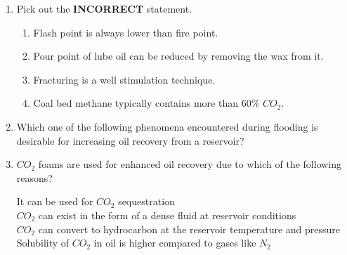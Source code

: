 \documentclass[journal,12pt,onecolumn]{IEEEtran}
\theoremstyle{remark}
\begin{document}
\begin{enumerate}
\item Pick out the \textbf{INCORRECT} statement.

\hfill{}

\begin{enumerate}
\item Flash point is always lower than fire point.
\item Pour point of lube oil can be reduced by removing the wax from it.
\item Fracturing is a well stimulation technique.
\item Coal bed methane typically contains more than 60\% $CO_2$.
\end{enumerate}

\item Which one of the following phenomena encountered during flooding is desirable for
increasing oil recovery from a reservoir?

\hfill{}

\begin{enumerate}
\end{enumerate}

\item $CO_2$ foams are used for enhanced oil recovery due to which of the following reasons?

\hfill{}
	
It can be used for $CO_2$ sequestration\\
 $CO_2$ can exist in the form of a dense fluid at reservoir conditions\\
 $CO_2$ can convert to hydrocarbon at the reservoir temperature and pressure\\
 Solubility of $CO_2$ in oil is higher compared to gases like $N_2$

\begin{enumerate}
\end{enumerate}


\end{enumerate}
\end{document}
